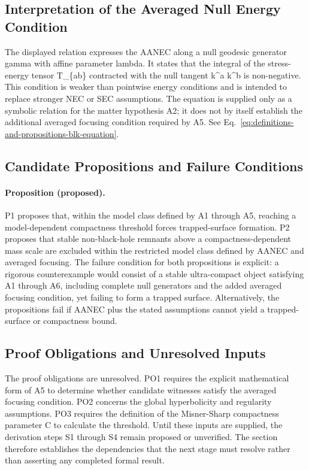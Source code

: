 \documentclass[conference]{IEEEtran}
\begin{document}
\subsection{Interpretation of the Averaged Null Energy Condition}
The displayed relation expresses the AANEC along a null geodesic generator gamma with affine parameter lambda. It states that the integral of the stress-energy tensor T\_\{ab\} contracted with the null tangent k\textasciicircum{}a k\textasciicircum{}b is non-negative. This condition is weaker than pointwise energy conditions and is intended to replace stronger NEC or SEC assumptions. The equation is supplied only as a symbolic relation for the matter hypothesis A2; it does not by itself establish the additional averaged focusing condition required by A5. See Eq.~\eqref{eq:definitions-and-propositions-blk-equation}.

\subsection{Candidate Propositions and Failure Conditions}
\paragraph{Proposition (proposed).} P1 proposes that, within the model class defined by A1 through A5, reaching a model-dependent compactness threshold forces trapped-surface formation. P2 proposes that stable non-black-hole remnants above a compactness-dependent mass scale are excluded within the restricted model class defined by AANEC and averaged focusing. The failure condition for both propositions is explicit: a rigorous counterexample would consist of a stable ultra-compact object satisfying A1 through A6, including complete null generators and the added averaged focusing condition, yet failing to form a trapped surface. Alternatively, the propositions fail if AANEC plus the stated assumptions cannot yield a trapped-surface or compactness bound.

\subsection{Proof Obligations and Unresolved Inputs}
The proof obligations are unresolved. PO1 requires the explicit mathematical form of A5 to determine whether candidate witnesses satisfy the averaged focusing condition. PO2 concerns the global hyperbolicity and regularity assumptions. PO3 requires the definition of the Misner-Sharp compactness parameter C to calculate the threshold. Until these inputs are supplied, the derivation steps S1 through S4 remain proposed or unverified. The section therefore establishes the dependencies that the next stage must resolve rather than asserting any completed formal result.
\end{document}
